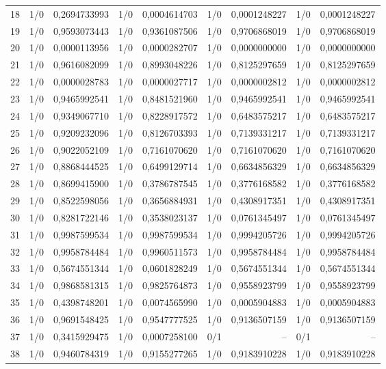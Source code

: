 \begin{longtable}{lrrrrrrrr}
18 & 1/0 & 0,2694733993 & 1/0 & 0,0004614703 & 1/0 & 0,0001248227 & 1/0 & 0,0001248227 \\
19 & 1/0 & 0,9593073443 & 1/0 & 0,9361087506 & 1/0 & 0,9706868019 & 1/0 & 0,9706868019 \\
20 & 1/0 & 0,0000113956 & 1/0 & 0,0000282707 & 1/0 & 0,0000000000 & 1/0 & 0,0000000000 \\
21 & 1/0 & 0,9616082099 & 1/0 & 0,8993048226 & 1/0 & 0,8125297659 & 1/0 & 0,8125297659 \\
22 & 1/0 & 0,0000028783 & 1/0 & 0,0000027717 & 1/0 & 0,0000002812 & 1/0 & 0,0000002812 \\
23 & 1/0 & 0,9465992541 & 1/0 & 0,8481521960 & 1/0 & 0,9465992541 & 1/0 & 0,9465992541 \\
24 & 1/0 & 0,9349067710 & 1/0 & 0,8228917572 & 1/0 & 0,6483575217 & 1/0 & 0,6483575217 \\
25 & 1/0 & 0,9209232096 & 1/0 & 0,8126703393 & 1/0 & 0,7139331217 & 1/0 & 0,7139331217 \\
26 & 1/0 & 0,9022052109 & 1/0 & 0,7161070620 & 1/0 & 0,7161070620 & 1/0 & 0,7161070620 \\
27 & 1/0 & 0,8868444525 & 1/0 & 0,6499129714 & 1/0 & 0,6634856329 & 1/0 & 0,6634856329 \\
28 & 1/0 & 0,8699415900 & 1/0 & 0,3786787545 & 1/0 & 0,3776168582 & 1/0 & 0,3776168582 \\
29 & 1/0 & 0,8522598056 & 1/0 & 0,3656884931 & 1/0 & 0,4308917351 & 1/0 & 0,4308917351 \\
30 & 1/0 & 0,8281722146 & 1/0 & 0,3538023137 & 1/0 & 0,0761345497 & 1/0 & 0,0761345497 \\
31 & 1/0 & 0,9987599534 & 1/0 & 0,9987599534 & 1/0 & 0,9994205726 & 1/0 & 0,9994205726 \\
32 & 1/0 & 0,9958784484 & 1/0 & 0,9960511573 & 1/0 & 0,9958784484 & 1/0 & 0,9958784484 \\
33 & 1/0 & 0,5674551344 & 1/0 & 0,0601828249 & 1/0 & 0,5674551344 & 1/0 & 0,5674551344 \\
34 & 1/0 & 0,9868581315 & 1/0 & 0,9825764873 & 1/0 & 0,9558923799 & 1/0 & 0,9558923799 \\
35 & 1/0 & 0,4398748201 & 1/0 & 0,0074565990 & 1/0 & 0,0005904883 & 1/0 & 0,0005904883 \\
36 & 1/0 & 0,9691548425 & 1/0 & 0,9547777525 & 1/0 & 0,9136507159 & 1/0 & 0,9136507159 \\
37 & 1/0 & 0,3415929475 & 1/0 & 0,0007258100 & 0/1 & -- & 0/1 & -- \\
38 & 1/0 & 0,9460784319 & 1/0 & 0,9155277265 & 1/0 & 0,9183910228 & 1/0 & 0,9183910228 \\

\end{longtable}
